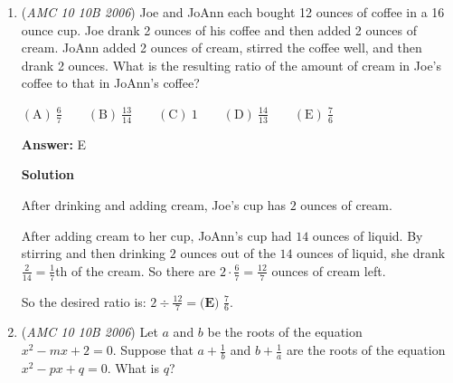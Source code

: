 \begin{enumerate}
 $1 = \frac{1}{4} \cdot 2 + a$
$a = \frac{1}{2}$
$2 = \frac{1}{4} \cdot 1 + b$
$b = \frac{7}{4}$

 So $a+b = \frac{1}{2} + \frac{7}{4} = \boxed{\textbf{(E) }\frac{9}{4}}$.

 



\textbf{Solution 2}

Substituting $x=1$ and $y=2$ into the equations gives $1=\frac{2}{4}+a\quad\text{and}\quad 2=\frac{1}{4}+b.$ It follows that $a+b=\left(1-\frac{2}{4}\right)+\left(2-\frac{1}{4}\right)=3 - \frac{3}{4}=\boxed{\frac{9}{4}}.$




\textbf{Solution 3}

Because $a=x- \frac{y}{4}\quad\text{and}\quad b=y-\frac{x}{4} \quad\text{we have}\quad a +b = \frac{3}{4}(x+y).$ Since $x=1$ when $y=2$, this implies that $a+b = \frac{3}{4}(1 + 2) = \boxed{\frac{9}{4}}$.

 


	\item (\textit{AMC 10 10B 2006}) Joe and JoAnn each bought 12 ounces of coffee in a 16 ounce cup. Joe drank 2 ounces of his coffee and then added 2 ounces of cream. JoAnn added 2 ounces of cream, stirred the coffee well, and then drank 2 ounces. What is the resulting ratio of the amount of cream in Joe's coffee to that in JoAnn's coffee? 


 $\mathrm{(A) \ } \frac{6}{7}\qquad \mathrm{(B) \ } \frac{13}{14}\qquad \mathrm{(C) \ }1 \qquad \mathrm{(D) \ } \frac{14}{13}\qquad \mathrm{(E) \ } \frac{7}{6}$

 \textbf{Answer: }E



\textbf{Solution}

After drinking and adding cream, Joe's cup has $2$ ounces of cream. 

 After adding cream to her cup, JoAnn's cup had $14$ ounces of liquid. By stirring and then drinking $2$ ounces out of the $14$ ounces of liquid, she drank $\frac{2}{14}=\frac{1}{7}$th of the cream. So there are $2\cdot\frac{6}{7}=\frac{12}{7}$ ounces of cream left. 

 So the desired ratio is: $2 \div \frac{12}{7}= \boxed{\textbf{(E) }\frac{7}{6}}$.

 


	\item (\textit{AMC 10 10B 2006}) Let $a$ and $b$ be the roots of the equation $x^2-mx+2=0$. Suppose that $a+\frac{1}{b}$ and $b+\frac{1}{a}$ are the roots of the equation $x^2-px+q=0$. What is $q$?



\end{enumerate}
